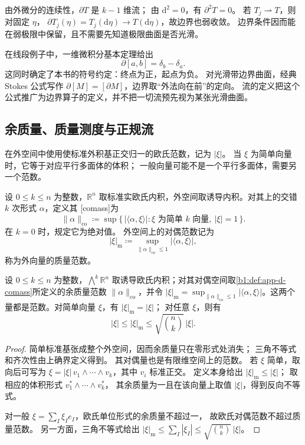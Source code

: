 由外微分的连续性，\(\partial T\) 是 \(k-1\) 维流；
由 \(\mathrm{d}^2=0\)，有 \(\partial^2T=0\)。
若 \(T_j\rightharpoonup T\)，则对固定 \(\eta\)，
\(\partial T_j(\eta)=T_j(\mathrm{d}\eta)\to T(\mathrm{d}\eta)\)，故边界也弱收敛。
边界条件因而能在弱极限中保留，且不需要先知道极限曲面是否光滑。

\ProseParagraphBreak

在线段例子中，一维微积分基本定理给出
\[
 \partial[a,b]=\delta_b-\delta_a.
\]
这同时确定了本书的符号约定：终点为正，起点为负。
对光滑带边界曲面，经典 Stokes 公式写作
\(\partial[M]=[\partial M]\)，边界取“外法向在前”的定向。
流的定义把这个公式推广为边界算子的定义，并不把一切流预先视为某张光滑曲面。

\subsection{余质量、质量测度与正规流}
\label{b1:subsec:D10203}

在外空间中使用使标准外积基正交归一的欧氏范数，记为 \(|\xi|\)。
当 \(\xi\) 为简单向量时，它等于对应平行多面体的体积；
一般向量可能不是一个平行多面体，需要另一个范数。

\begin{definition}\label{b1:def:app-d-comass}
设 \(0\le k\le n\) 为整数，\(\mathbb R^n\) 取标准实欧氏内积，外空间取诱导内积。对其上的交错 \(k\) 次形式 \(\alpha\)，定义其%
[comass]为
\[
 \|\alpha\|_{\mathrm{co}}
  \coloneqq\sup\{\,|\langle\alpha,\xi\rangle|:
                   \xi\text{ 为简单 }k\text{ 向量},\ |\xi|=1\,\}.
\]
在 \(k=0\) 时，规定它为绝对值。
外空间上的对偶范数记为
\[
 |\xi|_{\mathrm m}
    \coloneqq\sup_{\|\alpha\|_{\mathrm{co}}\leq1}|\langle\alpha,\xi\rangle|,
\]
称为外向量的质量范数。
\end{definition}

\begin{proposition}\label{b1:prop:app-d-mass-comass}
设 \(0\le k\le n\) 为整数，\(\bigwedge^k\mathbb R^n\) 取诱导欧氏内积；对其对偶空间取\cref{b1:def:app-d-comass}所定义的余质量范数 \(\|\alpha\|_{\mathrm{co}}\)，并令 \(|\xi|_{\mathrm m}=\sup_{\|\alpha\|_{\mathrm{co}}\le1}|\langle\alpha,\xi\rangle|\)。这两个量都是范数。对简单向量 \(\xi\)，有 \(|\xi|_{\mathrm m}=|\xi|\)；
对任意 \(\xi\)，则有
\[
 |\xi|\leq|\xi|_{\mathrm m}\leq
           \sqrt{\binom nk}\,|\xi|.
\]
\end{proposition}
\begin{proof}
简单标准基张成整个外空间，因而余质量只在零形式处消失；
三角不等式和齐次性由上确界定义得到。
其对偶量也是有限维空间上的范数。
若 \(\xi\) 简单，取向后可写为
\(\xi=|\xi|\,v_1\wedge\cdots\wedge v_k\)，其中 \(v_i\) 标准正交。
定义本身给出 \(|\xi|_{\mathrm m}\leq|\xi|\)；
取相应的体积形式 \(v_1^*\wedge\cdots\wedge v_k^*\)，
其余质量为一且在该向量上取值 \(|\xi|\)，得到反向不等式。

对一般 \(\xi=\sum_I\xi_Ie_I\)，欧氏单位形式的余质量不超过一，
故欧氏对偶范数不超过质量范数。
另一方面，三角不等式给出
\(|\xi|_{\mathrm m}\leq\sum_I|\xi_I|
\leq\sqrt{\binom nk}\,|\xi|\)。
\end{proof}

